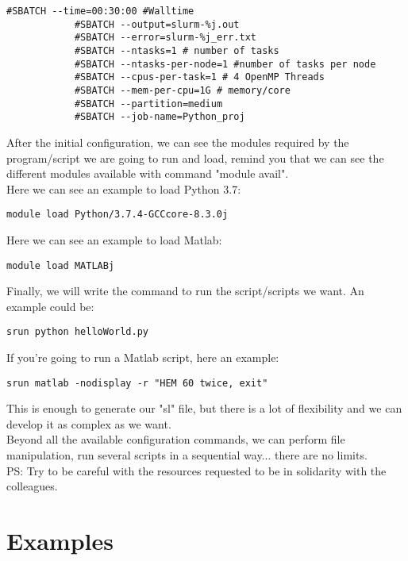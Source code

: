 \documentclass[a4paper]{article}
\begin{document}
		\begin{lstlisting}[caption=Connection Hipatia, label=lst:connectionHipatia]
			#SBATCH --time=00:30:00 #Walltime
			#SBATCH --output=slurm-%j.out
			#SBATCH --error=slurm-%j_err.txt
			#SBATCH --ntasks=1 # number of tasks
			#SBATCH --ntasks-per-node=1 #number of tasks per node
			#SBATCH --cpus-per-task=1 # 4 OpenMP Threads
			#SBATCH --mem-per-cpu=1G # memory/core
			#SBATCH --partition=medium
			#SBATCH --job-name=Python_proj
		\end{lstlisting}
		After the initial configuration, we can see the modules required by the program/script we are going to run and load, remind you that we can see the different modules available with command "module avail".\\ 
		Here we can see an example to load Python 3.7:\\
		\begin{lstlisting}[caption=Load module Python 3.7, label=lst:loadPython37]
			module load Python/3.7.4-GCCcore-8.3.0j
		\end{lstlisting}
		Here we can see an example to load Matlab:\\
		\begin{lstlisting}[caption=Load module MATLAB, label=lst:loadMatlab]
			module load MATLABj
		\end{lstlisting}
		Finally, we will write the command to run the script/scripts we want. An example could be:
		\begin{lstlisting}[caption=Run file Python, label=lst:runFilePython37]
			srun python helloWorld.py
		\end{lstlisting}
		If you're going to run a Matlab script, here an example:
		\begin{lstlisting}[caption=Run file Matlab, label=lst:runFileMatlab]
			srun matlab -nodisplay -r "HEM 60 twice, exit"
		\end{lstlisting}
		This is enough to generate our "sl" file, but there is a lot of flexibility and we can develop it as complex as we want.\\
		Beyond all the available configuration commands, we can perform file manipulation, run several scripts in a sequential way... there are no limits.\\
		PS: Try to be careful with the resources requested to be in solidarity with the colleagues.\\
	\section{Examples}
\end{document}
